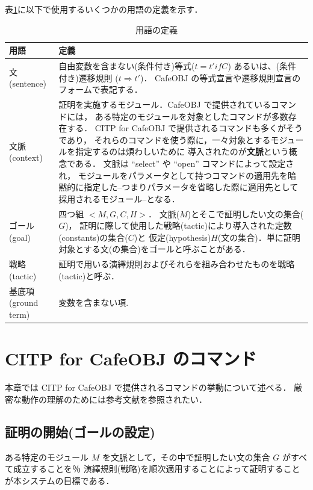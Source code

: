 \documentclass[a4paper,oneside,10pt,here]{memoir}
\begin{document}
表\ref{table:terms}に以下で使用するいくつかの用語の定義を示す．
\begin{table}
\caption{用語の定義}
\label{table:terms}
\begin{center}
\begin{tabular}[htb]{|l|p{}|}\hline
用語 & 定義 \\\hline\hline
文(sentence)   & 自由変数を含まない(条件付き)等式($t = t' if C$) あるいは、(条件付き)遷移規則 ($t \Rightarrow t'$)．
CafeOBJ の等式宣言や遷移規則宣言のフォームで表記する． \\\hline 
文脈(context) & 証明を実施するモジュール．CafeOBJ で提供されているコマンドには，
ある特定のモジュールを対象としたコマンドが多数存在する．
CITP for CafeOBJ で提供されるコマンドも多くがそうであり，
それらのコマンドを使う際に，一々対象とするモジュールを指定するのは煩わしいために%
導入されたのが\textbf{文脈}という概念である．
文脈は ``select'' や ``open'' コマンドによって設定され，
モジュールをパラメータとして持つコマンドの適用先を暗黙的に指定した--つまりパラメータを省略した際に適用先として%
採用されるモジュール--となる．
\\\hline
ゴール(goal) & 四つ組 $<M,G,C,H>$． 文脈($M$)とそこで証明したい文の集合($G$)，
証明に際して使用した戦略(tactic)により導入された定数(constants)の集合($C$)と
仮定(hypothesis)$H$(文の集合)．単に証明対象とする文(の集合)をゴールと呼ぶことがある．\\\hline
戦略(tactic) & 証明で用いる演繹規則およびそれらを組み合わせたものを戦略(tactic)と呼ぶ．\\\hline
基底項(ground term) & 変数を含まない項. \\\hline
\end{tabular}
\end{center}
\end{table}


\chapter{CITP for CafeOBJ のコマンド}\label{chap:new-commands}
本章では CITP for CafeOBJ で提供されるコマンドの挙動について述べる．
厳密な動作の理解のためには参考文献を参照されたい．
\section{証明の開始(ゴールの設定)} \label{sec:start-proof}
ある特定のモジュール $M$ を文脈として，その中で証明したい文の集合 $G$ がすべて成立することを％
演繹規則(戦略)を順次適用することによって証明することが本システムの目標である．
\end{document}
